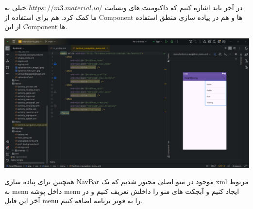 در آخر باید اشاره کنیم که داکیومنت های وبسایت $https://m3.material.io/$ خیلی به ما کمک کرد. هم برای استفاده از Component ها و هم در پیاده سازی منطق استفاده از این Component ها.



\includegraphics[width=1\linewidth]{screenshot005}

همچنین برای پیاده سازی NavBar موجود در منو اصلی مجبور شدیم که یک xml مربوط به menu داخل پوشه menu ایجاد کنیم و آبجکت های منو را داخلش تعریف کنیم و در آخر این فایل menu را به فوتر برنامه اضافه کنیم.








